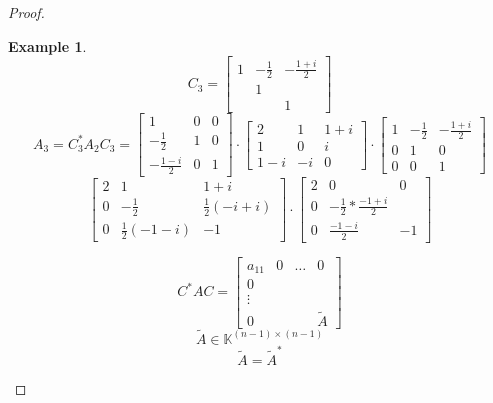 \documentclass{article}
\newtheorem{example}{Example}  \numberwithin{example}{section}
\begin{document}
\begin{proof}
\begin{description}
      \begin{example}
        \[
          C_3 = \begin{bmatrix}
            1 & -\frac12 & -\frac{1+i}2 \\
              & 1        & \\
              &          & 1
          \end{bmatrix}
        \] \[
          A_3 = C_3^* A_2 C_3 = \begin{bmatrix}
            1 & 0 & 0 \\
            -\frac12 & 1 & 0 \\
            -\frac{1-i}{2} & 0 & 1
          \end{bmatrix} \cdot \begin{bmatrix}
            2 & 1 & 1+i \\
            1 & 0 & i \\
            1-i & -i & 0
          \end{bmatrix} \cdot \begin{bmatrix}
            1 & -\frac12 & -\frac{1+i}{2} \\
            0 & 1 & 0 \\
            0 & 0 & 1
          \end{bmatrix}
        \] \[
          \begin{bmatrix}
            2 & 1 & 1+i \\
            0 & -\frac12 & \frac12 (-i + i) \\
            0 & \frac12 (-1-i) & -1
          \end{bmatrix} \cdot \begin{bmatrix}
            2 & 0 & 0 \\
            0 & -\frac12 * \frac{-1+i}{2} \\
            0 & \frac{-1-i}{2} & -1
          \end{bmatrix}
        \]
      \end{example}
      \[
        C^* AC = \begin{bmatrix}
          a_{11} & 0 & \ldots & 0 \\
          0      &   &        &   \\
          \vdots &   &        &   \\
          0      &   &        & \tilde{A}
        \end{bmatrix}
      \] \[
        \tilde{A} \in \mathbb K^{(n-1) \times (n-1)}
      \] \[
        \tilde{A} = \tilde{A}^*
      \]


\end{description}
\end{proof}
\end{document}
